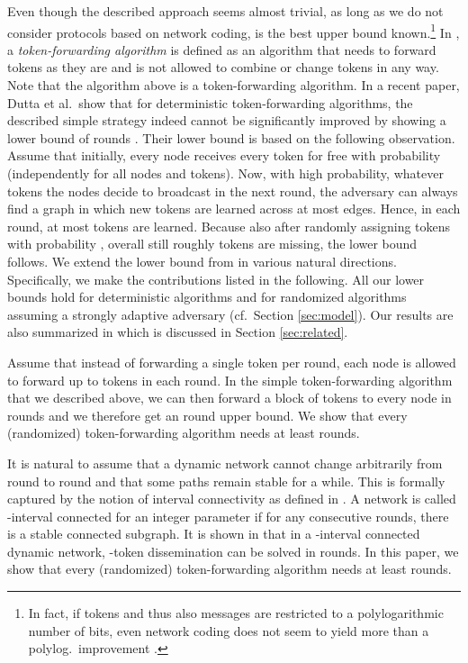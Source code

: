 \documentclass{llncs}
\renewcommand{\paragraph}[1]{\medskip\noindent{\bf #1\ }}
\begin{document}
Even though the described approach seems almost trivial, as long as we
do not consider protocols based on network coding,  is the best
upper bound known.\footnote{In fact, if tokens and thus also messages
    are restricted to a polylogarithmic number of bits, even network
    coding does not seem to yield more than a polylog.\
    improvement \cite{AnalyzingNC,HK}.} In \cite{KLO}, a
\emph{token-forwarding algorithm} is defined as an algorithm that
needs to forward tokens as they are and is not allowed to combine or
change tokens in any way. Note that the algorithm above is a
token-forwarding algorithm. In a recent paper, Dutta et al.\ show that
for deterministic token-forwarding algorithms, the described simple
strategy indeed cannot be significantly improved by showing a lower
bound of  rounds \cite{LBarxiv}. Their lower bound
is based on the following observation. Assume that initially, every
node receives every token for free with probability 
(independently for all nodes and tokens). Now, with high probability,
whatever tokens the nodes decide to broadcast in the next round, the
adversary can always find a graph in which new tokens are learned
across at most  edges. Hence, in each round, at most
 tokens are learned.  Because also after randomly assigning
tokens with probability , overall still roughly  tokens are
missing, the lower bound follows. We extend the
lower bound from \cite{LBarxiv} in various natural
directions. Specifically, we make the contributions listed in the
following. All our lower bounds hold for deterministic algorithms and
for randomized algorithms assuming a strongly adaptive adversary (cf.\
Section \ref{sec:model}). Our results are also summarized in
\Cref{table:bounds} which is discussed in Section \ref{sec:related}.

\paragraph{Multiple Tokens per Round:} Assume that instead of
forwarding a single token per round, each node is allowed to forward
up to  tokens in each round. In the simple token-forwarding
algorithm that we described above, we can then forward a block of 
tokens to every node in  rounds and we therefore get an
 round upper bound.  We show that every
(randomized) token-forwarding algorithm needs at least  rounds. 

\paragraph{Interval Connectivity:} It is natural to assume that a
dynamic network cannot change arbitrarily from round to round and that
some paths remain stable for a while. This is formally captured by the
notion of interval connectivity as defined in \cite{KLO}. A network is
called -interval connected for an integer parameter  if
for any  consecutive rounds, there is a stable connected
subgraph. It is shown in \cite{KLO} that in a -interval connected
dynamic network, -token dissemination can be solved in  rounds. In this paper, we show that every
(randomized) token-forwarding algorithm needs at least  rounds. 
\end{document}
